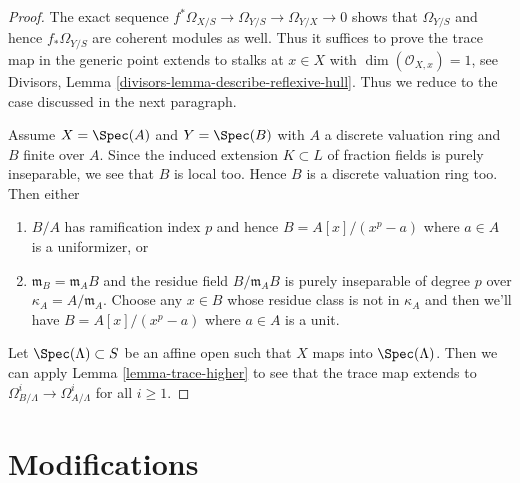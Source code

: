 \begin{proof}
The exact sequence $f^*\Omega_{X/S} \to \Omega_{Y/S} \to \Omega_{Y/X} \to 0$
shows that $\Omega_{Y/S}$ and hence $f_*\Omega_{Y/S}$ are coherent modules
as well. Thus it suffices to prove the trace map in the generic point
extends to stalks at $x \in X$ with $\dim(\mathcal{O}_{X, x}) = 1$, see
Divisors, Lemma \ref{divisors-lemma-describe-reflexive-hull}.
Thus we reduce to the case discussed in the next paragraph.

\medskip\noindent
Assume $X = \Spec(A)$ and $Y = \Spec(B)$ with $A$ a discrete valuation
ring and $B$ finite over $A$. Since the induced extension $K \subset L$
of fraction fields is purely inseparable, we see that $B$ is local too.
Hence $B$ is a discrete valuation ring too. Then either
\begin{enumerate}
\item $B/A$ has ramification index $p$ and hence $B = A[x]/(x^p - a)$
where $a \in A$ is a uniformizer, or
\item $\mathfrak m_B = \mathfrak m_A B$ and the residue field
$B/\mathfrak m_A B$ is purely inseparable of degree $p$ over
$\kappa_A = A/\mathfrak m_A$.
Choose any $x \in B$ whose residue class is not in $\kappa_A$
and then we'll have $B = A[x]/(x^p - a)$ where $a \in A$ is
a unit.
\end{enumerate}
Let $\Spec(\Lambda) \subset S$ be an affine open such that
$X$ maps into $\Spec(\Lambda)$. Then we can apply
Lemma \ref{lemma-trace-higher}
to see that the trace map extends to
$\Omega^i_{B/\Lambda} \to \Omega^i_{A/\Lambda}$
for all $i \geq 1$.
\end{proof}














\section{Modifications}
\label{section-modifications}

